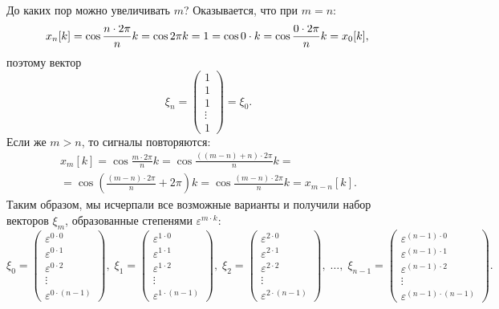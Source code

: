 До каких пор можно увеличивать $m$? Оказывается, что при $m = n$:
\[
    x_n[k]
    = \cos \frac{n \cdot 2 \pi}{n} k
    = \cos 2 \pi k
    = 1
    = \cos 0 \cdot k
    = \cos \frac{0 \cdot 2 \pi}{n} k
    = x_0[k]
    , \\
\]
поэтому вектор
\[
    \xi_n
    = \begin{pmatrix}
          1      \\
          1      \\
          1      \\
          \vdots \\
          1
    \end{pmatrix}
    = \xi_0.
\]
Если же $m > n$, то сигналы повторяются:
\begin{multline*}
    x_m[k]
    = \cos \frac{m \cdot 2 \pi}{n} k
    = \cos \frac{((m-n) + n) \cdot 2 \pi}{n} k = \\
    = \cos \left( \frac{(m-n) \cdot 2 \pi}{n} + 2 \pi  \right) k
    = \cos \frac{(m-n) \cdot 2 \pi}{n} k
    = x_{m-n}[k].
\end{multline*}
Таким образом, мы исчерпали все возможные варианты и получили набор векторов $\xi_m$, образованные степенями $\varepsilon^{m \cdot k}$:
\[
    \xi_0
    = \begin{pmatrix}
          \varepsilon^{0 \cdot 0} \\
          \varepsilon^{0 \cdot 1} \\
          \varepsilon^{0 \cdot 2} \\
          \vdots                  \\
          \varepsilon^{0 \cdot (n-1)}
    \end{pmatrix} ,
    \;
    \xi_1
    = \begin{pmatrix}
          \varepsilon^{1 \cdot 0} \\
          \varepsilon^{1 \cdot 1} \\
          \varepsilon^{1 \cdot 2} \\
          \vdots                  \\
          \varepsilon^{1 \cdot (n-1)}
    \end{pmatrix} ,
    \;
    \xi_2
    = \begin{pmatrix}
          \varepsilon^{2 \cdot 0} \\
          \varepsilon^{2 \cdot 1} \\
          \varepsilon^{2 \cdot 2} \\
          \vdots                  \\
          \varepsilon^{2 \cdot (n-1)}
    \end{pmatrix} ,
    \;
    \dots ,
    \;
    \xi_{n-1}
    = \begin{pmatrix}
          \varepsilon^{(n-1) \cdot 0} \\
          \varepsilon^{(n-1) \cdot 1} \\
          \varepsilon^{(n-1) \cdot 2} \\
          \vdots                      \\
          \varepsilon^{(n-1) \cdot (n-1)}
    \end{pmatrix} .
\]
